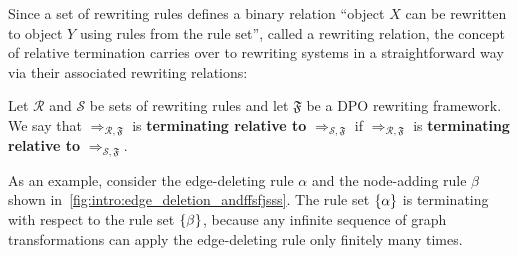 Since a set of rewriting rules defines a binary relation \enquote{object $X$ can be rewritten to object $Y$ using rules from the rule set}, called a rewriting relation,
the concept of relative termination
carries over to rewriting systems in a straightforward way via their associated rewriting relations:
\begin{definition}
    \label{termination:def:relative_termination}
     Let $\mathcal{R}$ and $\mathcal{S}$ be sets of rewriting rules and let $\mathfrak{F}$ be a DPO rewriting framework. 
     We say that $\Rightarrow_{\mathcal{R},\mathfrak{F}}$ is \textbf{terminating relative to} $\Rightarrow_{\mathcal{S}, \mathfrak{F}}$ if 
     $\Rightarrow_{\mathcal{R},\mathfrak{F}}$ is \textbf{terminating relative to} $\Rightarrow_{\mathcal{S}, \mathfrak{F}}$.
\end{definition}
As an example, consider the edge-deleting rule $\alpha$ and the node-adding rule $\beta$ shown in~\autoref{fig:intro:edge_deletion_andffsfjsss}. The rule set $\{\alpha\}$ is terminating with respect to the rule set $\{\beta\}$, because any infinite sequence of graph transformations can apply the edge-deleting rule only finitely many times.
